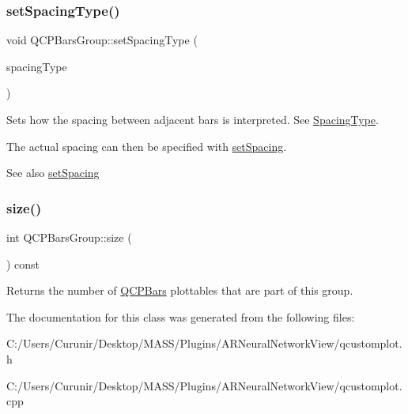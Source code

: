 \subsubsection{\texorpdfstring{set\+Spacing\+Type()}{setSpacingType()}}
{\footnotesize\ttfamily void Q\+C\+P\+Bars\+Group\+::set\+Spacing\+Type (\begin{DoxyParamCaption}\item[{\hyperlink{class_q_c_p_bars_group_a4c0521120a97e60bbca37677a37075b6}{Spacing\+Type}}]{spacing\+Type }\end{DoxyParamCaption})}

Sets how the spacing between adjacent bars is interpreted. See \hyperlink{class_q_c_p_bars_group_a4c0521120a97e60bbca37677a37075b6}{Spacing\+Type}.

The actual spacing can then be specified with \hyperlink{class_q_c_p_bars_group_aa553d327479d72a0c3dafcc724a190e2}{set\+Spacing}.

\begin{DoxySeeAlso}{See also}
\hyperlink{class_q_c_p_bars_group_aa553d327479d72a0c3dafcc724a190e2}{set\+Spacing} 
\end{DoxySeeAlso}
\mbox{\label{class_q_c_p_bars_group_a3780ec77919cb00840207ec7a0f00dd5}} 
\subsubsection{\texorpdfstring{size()}{size()}}
{\footnotesize\ttfamily int Q\+C\+P\+Bars\+Group\+::size (\begin{DoxyParamCaption}{ }\end{DoxyParamCaption}) const\hspace{0.3cm}{\ttfamily [inline]}}

Returns the number of \hyperlink{class_q_c_p_bars}{Q\+C\+P\+Bars} plottables that are part of this group. 

The documentation for this class was generated from the following files\+:\begin{DoxyCompactItemize}
\item 
C\+:/\+Users/\+Curunir/\+Desktop/\+M\+A\+S\+S/\+Plugins/\+A\+R\+Neural\+Network\+View/qcustomplot.\+h\item 
C\+:/\+Users/\+Curunir/\+Desktop/\+M\+A\+S\+S/\+Plugins/\+A\+R\+Neural\+Network\+View/qcustomplot.\+cpp\end{DoxyCompactItemize}
